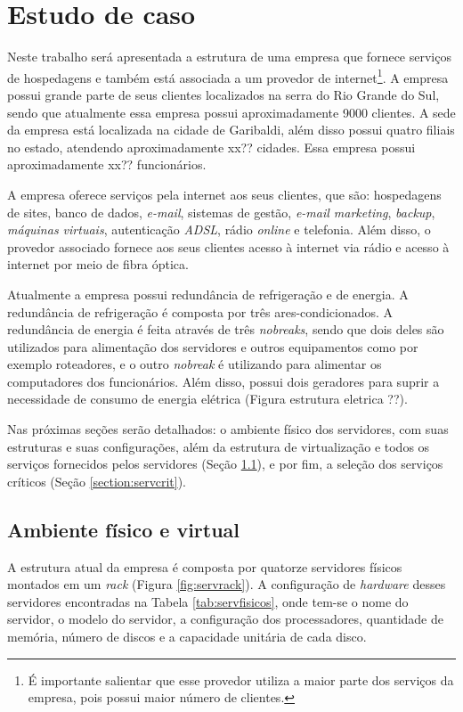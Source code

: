 \chapter{Estudo de caso}
\label{cap:estudodecaso}

Neste trabalho será apresentada a estrutura de uma empresa que fornece serviços de hospedagens e também está associada a um provedor de 
internet\footnote{É importante salientar que esse provedor utiliza a maior parte dos serviços da empresa, pois possui maior número de clientes.}. 
A empresa possui grande parte de seus clientes localizados na serra do Rio Grande do Sul, sendo que atualmente essa empresa possui 
aproximadamente 9000 clientes. A sede da empresa está localizada na cidade de Garibaldi, além disso possui quatro filiais no estado, 
atendendo aproximadamente xx?? cidades. Essa empresa possui aproximadamente xx?? funcionários.

A empresa oferece serviços pela internet aos seus clientes, que são: hospedagens de sites, banco de dados, \textit{e-mail}, sistemas de gestão, 
\textit{e-mail marketing}, \textit{backup}, \textit{máquinas virtuais}, autenticação \textit{ADSL}, rádio \textit{online} e telefonia.
Além disso, o provedor associado fornece aos seus clientes acesso à internet via rádio e acesso à internet por meio de fibra óptica.

Atualmente a empresa possui redundância de refrigeração e de energia. A redundância de refrigeração é composta por três ares-condicionados. 
A redundância de energia é feita através de três \textit{nobreaks}, sendo que dois deles são utilizados para alimentação dos servidores e outros 
equipamentos como por exemplo roteadores, e o outro \textit{nobreak} é utilizando para alimentar os computadores dos funcionários. Além disso, 
possui dois geradores para suprir a necessidade de consumo de energia elétrica (Figura estrutura eletrica ??).

Nas próximas seções serão detalhados: o ambiente físico dos servidores, com suas estruturas e suas configurações, além da estrutura de 
virtualização e todos os serviços fornecidos pelos servidores (Seção \ref{section:ambiente}), e por fim, a seleção dos serviços 
críticos (Seção \ref{section:servcrit}).

\section{Ambiente físico e virtual}
\label{section:ambiente}

A estrutura atual da empresa é composta por quatorze servidores físicos montados em um \textit{rack} (Figura \ref{fig:servrack}). 
A configuração de \textit{hardware} desses servidores encontradas na Tabela \ref{tab:servfisicos}, onde tem-se o nome do servidor, o modelo do 
servidor, a configuração dos processadores, quantidade de memória, número de discos e a capacidade unitária de cada disco.


